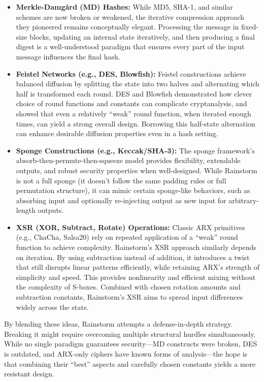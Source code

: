 \documentclass[11pt,a4paper]{article}
\begin{document}
\begin{itemize}
  \item \textbf{Merkle-Damg{\aa}rd (MD) Hashes:}  
    While MD5, SHA-1, and similar schemes are now broken or weakened, the iterative compression approach they pioneered remains conceptually elegant. Processing the message in fixed-size blocks, updating an internal state iteratively, and then producing a final digest is a well-understood paradigm that ensures every part of the input message influences the final hash.

  \item \textbf{Feistel Networks (e.g., DES, Blowfish):}  
    Feistel constructions achieve balanced diffusion by splitting the state into two halves and alternating which half is transformed each round. DES and Blowfish demonstrated how clever choice of round functions and constants can complicate cryptanalysis, and showed that even a relatively “weak” round function, when iterated enough times, can yield a strong overall design. Borrowing this half-state alternation can enhance desirable diffusion properties even in a hash setting.

  \item \textbf{Sponge Constructions (e.g., Keccak/SHA-3):}  
    The sponge framework’s absorb-then-permute-then-squeeze model provides flexibility, extendable outputs, and robust security properties when well-designed. While Rainstorm is not a full sponge (it doesn’t follow the same padding rules or full permutation structure), it can mimic certain sponge-like behaviors, such as absorbing input and optionally re-injecting output as new input for arbitrary-length outputs.

  \item \textbf{XSR (XOR, Subtract, Rotate) Operations:}  
    Classic ARX primitives (e.g., ChaCha, Salsa20) rely on repeated application of a “weak” round function to achieve complexity. Rainstorm’s XSR approach similarly depends on iteration. By using subtraction instead of addition, it introduces a twist that still disrupts linear patterns efficiently, while retaining ARX's strength of simplicity and speed. This provides nonlinearity and efficient mixing without the complexity of S-boxes. Combined with chosen rotation amounts and subtraction constants, Rainstorm's XSR aims to spread input differences widely across the state.
\end{itemize}

By blending these ideas, Rainstorm attempts a defense-in-depth strategy. Breaking it might require overcoming multiple structural hurdles simultaneously. While no single paradigm guarantees security—MD constructs were broken, DES is outdated, and ARX-only ciphers have known forms of analysis—the hope is that combining their “best” aspects and carefully chosen constants yields a more resistant design.
\end{document}
